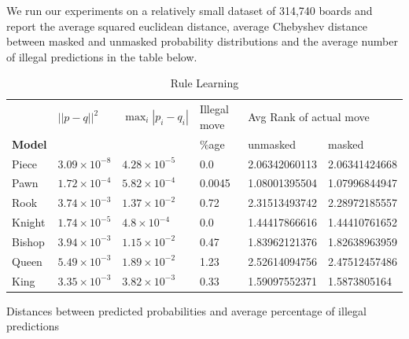 We run our experiments on a relatively small dataset of 314,740 boards and 
report the average squared euclidean distance, average Chebyshev distance 
between masked 
and unmasked probability distributions and the average number of illegal 
predictions in the table below.
\begin{table}[H]
\centering
\begin{tabular}{@{}llllll@{}}
\toprule
{\bf } & $||p-q||^2$ & $\max_i |p_i-q_i|$& Illegal move& 
\multicolumn{2}{l}{Avg Rank of actual move} \\ \cmidrule(l){5-6} 
{\bf Model}           &        &             &\%age                        & 
unmasked          & masked          \\ \midrule
{\sc Piece}  &     $3.09\times 10^{-8}$ & $4.28\times 10^{-5}$                 
    & 0.0 &2.06342060113 &2.06341424668                   
\\
{\sc Pawn}   &     $1.72\times 10^{-4}$               & $5.82\times 10^{-4}$    
                  & 0.0045 &       1.08001395504 &1.07996844947             
\\
{\sc Rook}   &             $3.74\times 10^{-3}$& $1.37\times 10^{-2}$           
 &   0.72       &2.31513493742 &2.28972185557           
\\
{\sc Knight} &       $1.74\times 10^{-5}$             &     $4.8\times 
10^{-4}$                  &       0.0 & 1.44417866616 &1.44410761652            
  
\\
{\sc Bishop}  &    $3.94\times 10^{-3}$                &  $1.15\times 10^{-2}$  
 
& 0.47                 &  1.83962121376 & 1.82638963959         
\\
{\sc Queen}  &     $5.49\times 10^{-3}$               & $1.89\times 10^{-2}$ &  
   1.23                &                   2.52614094756 &2.47512457486  
\\
{\sc King}   &    $3.35\times 10^{-3}$                &   $3.82\times 10^{-3}$ 
&       0.33            &      1.59097552371 & 1.5873805164        
\\ \bottomrule
\end{tabular}
\caption{Rule Learning}
\small\justifying
Distances between predicted probabilities and average 
percentage of illegal predictions
\label{table:rule-learning}
\end{table}
